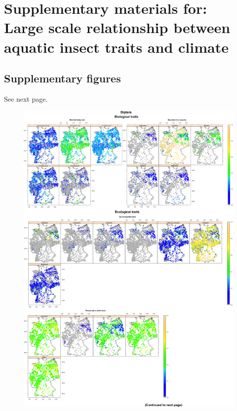 \chapter{Supplementary materials for:\\Large scale relationship between aquatic insect traits and climate}
\label{appendixC}

\section{Supplementary figures}
\label{Supplementary figures}

See next page.

\newpage

\begin{figure}[hp!]
  \centering
  \hspace{-2cm} \includegraphics[width=1.1\textwidth]{Figures/Fig_C_1_a.png}
  \label{Fig_C_1_a}
\end{figure}

